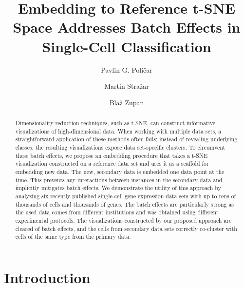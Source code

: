 \documentclass[runningheads]{llncs}
\begin{document}
%
\title{Embedding to Reference t-SNE Space Addresses Batch Effects in Single-Cell Classification}
%
%
\author{Pavlin G. Poli\v{c}ar \and
Martin Stra\v{z}ar \and
Bla\v{z} Zupan}
%
%

\maketitle

\begin{abstract}

Dimensionality reduction techniques, such as t-SNE, can construct informative
visualizations of high-dimensional data. When working with multiple data
sets, a straightforward application of these methods often fails; instead of
revealing underlying classes, the resulting visualizations expose data
set-specific clusters. To circumvent these batch effects, we propose an
embedding procedure that takes a t-SNE visualization constructed on a
reference data set and uses it as a scaffold for embedding new data. The new,
secondary data is embedded one data point at the time. This prevents any
interactions between instances in the secondary data and implicitly mitigates
batch effects. We demonstrate the utility of this approach by analyzing six
recently published single-cell gene expression data sets with up to tens of
thousands of cells and thousands of genes. The batch effects are particularly
strong as the used data comes from different institutions and was obtained
using different experimental protocols. The visualizations constructed by our
proposed approach are cleared of batch effects, and the cells from secondary
data sets correctly co-cluster with cells of the same type from the primary
data.

\end{abstract}


\section{Introduction}
\label{sec:intro}
\end{document}
